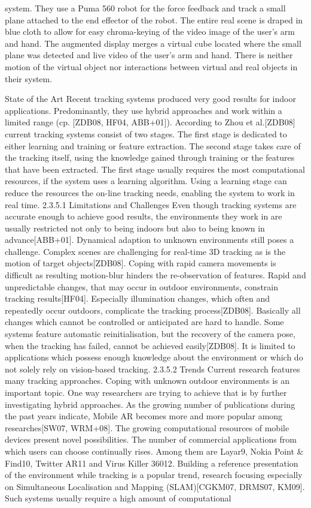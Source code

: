 system. They use a Puma 560 robot for the force feedback and track a small plane attached to the end effector of the robot. The entire real scene is draped in blue cloth to allow for easy chroma-keying of the video image of the user’s arm and hand. The augmented display merges a virtual cube located where the small plane was detected and live video of the user’s arm and hand. There is neither motion of the virtual object nor interactions between virtual and real objects in their system.



State of the Art Recent tracking systems produced very good results for indoor applications. Predominantly, they use hybrid approaches and work within a limited range (cp. [ZDB08, HF04, ABB+01]). According to Zhou et al.[ZDB08] current tracking systems consist of two stages. The first stage is dedicated to either learning and training or feature extraction. The second stage takes care of the tracking itself, using the knowledge gained through training or the features that have been extracted. The first stage usually requires the most computational resources, if the system uses a learning algorithm. Using a learning stage can reduce the resources the on-line tracking needs, enabling the system to work in real time. 2.3.5.1 Limitations and Challenges Even though tracking systems are accurate enough to achieve good results, the environments they work in are usually restricted not only to being indoors but also to being known in advance[ABB+01]. Dynamical adaption to unknown environments still poses a challenge. Complex scenes are challenging for real-time 3D tracking as is the motion of target objects[ZDB08]. Coping with rapid camera movements is difficult as resulting motion-blur hinders the re-observation of features. Rapid and unpredictable changes, that may occur in outdoor environments, constrain tracking results[HF04]. Especially illumination changes, which often and repeatedly occur outdoors, complicate the tracking process[ZDB08]. Basically all changes which cannot be controlled or anticipated are hard to handle. Some systems feature automatic reinitialisation, but the recovery of the camera pose, when the tracking has failed, cannot be achieved easily[ZDB08]. It is limited to applications which possess enough knowledge about the environment or which do not solely rely on vision-based tracking. 2.3.5.2 Trends Current research features many tracking approaches. Coping with unknown outdoor environments is an important topic. One way researchers are trying to achieve that is by further investigating hybrid approaches. As the growing number of publications during the past years indicate, Mobile AR becomes more and more popular among researches[SW07, WRM+08]. The growing computational resources of mobile devices present novel possibilities. The number of commercial applications from which users can choose continually rises. Among them are Layar9, Nokia Point \& Find10, Twitter AR11 and Virus Killer 36012. Building a reference presentation of the environment while tracking is a popular trend, research focusing especially on Simultaneous Localisation and Mapping (SLAM)[CGKM07, DRMS07, KM09]. Such systems usually require a high amount of computational 